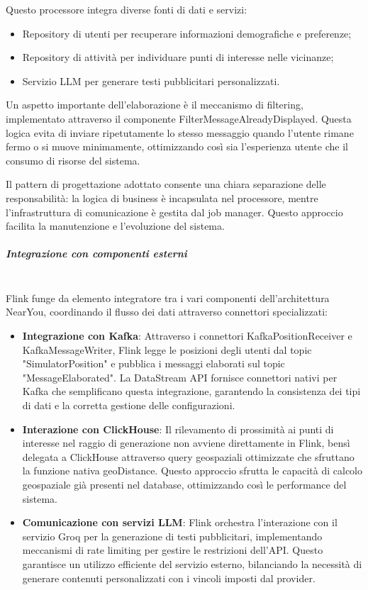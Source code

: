 \documentclass[10pt]{article}
\newcommand{\mysubparagraph}[1]{\subparagraph{#1}\mbox{}\\}
\begin{document}
        Questo processore integra diverse fonti di dati e servizi:
        \begin{itemize}
            \item Repository di utenti per recuperare informazioni demografiche e preferenze;
            \item Repository di attività per individuare punti di interesse nelle vicinanze;
            \item Servizio LLM per generare testi pubblicitari personalizzati.
        \end{itemize}

        Un aspetto importante dell'elaborazione è il meccanismo di filtering, implementato attraverso il componente FilterMessageAlreadyDisplayed. Questa logica evita di inviare ripetutamente lo stesso messaggio quando l'utente rimane fermo o si muove minimamente, ottimizzando così sia l'esperienza utente che il consumo di risorse del sistema.

        Il pattern di progettazione adottato consente una chiara separazione delle responsabilità: la logica di business è incapsulata nel processore, mentre l'infrastruttura di comunicazione è gestita dal job manager. Questo approccio facilita la manutenzione e l'evoluzione del sistema.

        \mysubparagraph{Integrazione con componenti esterni}
        Flink funge da elemento integratore tra i vari componenti dell'architettura NearYou, coordinando il flusso dei dati attraverso connettori specializzati:

        \begin{itemize}
            \item \textbf{Integrazione con Kafka}: Attraverso i connettori KafkaPositionReceiver e KafkaMessageWriter, Flink legge le posizioni degli utenti dal topic "SimulatorPosition" e pubblica i messaggi elaborati sul topic "MessageElaborated". La DataStream API fornisce connettori nativi per Kafka che semplificano questa integrazione, garantendo la consistenza dei tipi di dati e la corretta gestione delle configurazioni.

            \item \textbf{Interazione con ClickHouse}: Il rilevamento di prossimità ai punti di interesse nel raggio di generazione non avviene direttamente in Flink, bensì delegata a ClickHouse attraverso query geospaziali ottimizzate che sfruttano la funzione nativa geoDistance. Questo approccio sfrutta le capacità di calcolo geospaziale già presenti nel database, ottimizzando così le performance del sistema.

            \item \textbf{Comunicazione con servizi LLM}: Flink orchestra l'interazione con il servizio Groq per la generazione di testi pubblicitari, implementando meccanismi di rate limiting per gestire le restrizioni dell'API. Questo garantisce un utilizzo efficiente del servizio esterno, bilanciando la necessità di generare contenuti personalizzati con i vincoli imposti dal provider.
        \end{itemize}
\end{document}
